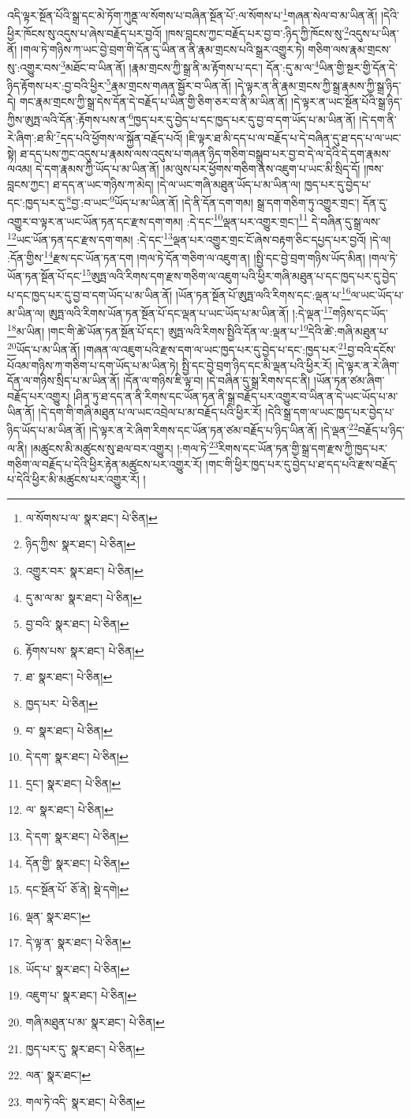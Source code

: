 འདི་ལྟར་སྔོན་པོའི་སྒྲ་དང་མེ་ཏོག་ཀུནྡ་ལ་སོགས་པ་བཞིན་སྔོན་པོ་:ལ་སོགས་པ་\footnote{ལ་སོགས་པ་ལ་  སྣར་ཐང་།  པེ་ཅིན། }གཞན་སེལ་བ་མ་ཡིན་ནོ། །དེའི་ཕྱིར་ཁོངས་སུ་འདུས་པ་ཞེས་བརྗོད་པར་བྱའོ། །ཁས་བླངས་ཀྱང་བརྗོད་པར་བྱ་བ་:ཉིད་ཀྱི་ཁོངས་སུ་\footnote{ཉིད་ཀྱིས་  སྣར་ཐང་།  པེ་ཅིན། }འདུས་པ་ཡིན་ནོ། །གལ་ཏེ་གཉིས་ཀ་ཡང་བྱེ་བྲག་གི་དོན་དུ་ཡིན་ན་ནི་རྣམ་གྲངས་པའི་སྒྲར་འགྱུར་ཏེ། གཅིག་ལས་རྣམ་གྲངས་སུ་:འགྱུར་བས་\footnote{འགྱུར་བར་  སྣར་ཐང་།  པེ་ཅིན། }མཐོང་བ་ཡིན་ནོ། །རྣམ་གྲངས་ཀྱི་སྒྲ་ནི་མ་རྟོགས་པ་དང་། དོན་:དུ་མ་ལ་\footnote{དུ་མ་ལ་མ་  སྣར་ཐང་།  པེ་ཅིན། }ཡིན་གྱི་སྔར་གྱི་དོན་དེ་ཉིད་རྟོགས་པར་:བྱ་བའི་ཕྱིར་\footnote{བྱ་བའི་  སྣར་ཐང་།  པེ་ཅིན། }རྣམ་གྲངས་གཞན་སྦྱོར་བ་ཡིན་ནོ། །དེ་ལྟར་ན་ནི་རྣམ་གྲངས་ཀྱི་སྒྲ་རྣམས་ཀྱི་སྒྲ་ཉིད་དེ། གང་རྣམ་གྲངས་ཀྱི་སྒྲ་དེས་དོན་དེ་བརྗོད་པ་ཡིན་གྱི་ཅིག་ཅར་བ་ནི་མ་ཡིན་ནོ། །དེ་ལྟར་ན་ཡང་སྔོན་པོའི་སྒྲ་ཉིད་ཀྱིས་ཨུཏྤ་ལའི་དོན་:རྟོགས་པས་ན་\footnote{རྟོགས་པས་  སྣར་ཐང་།  པེ་ཅིན། }ཁྱད་པར་དུ་བྱེད་པ་དང་ཁྱད་པར་དུ་བྱ་བ་དག་ཡོད་པ་མ་ཡིན་ནོ། །དེ་དག་ནི་རེ་ཞིག་:ཐ་མི་\footnote{ཐ་  སྣར་ཐང་།  པེ་ཅིན། }དད་པའི་ཕྱོགས་ལ་སྐྱོན་བརྗོད་པའོ། །ཇི་ལྟར་ཐ་མི་དད་པ་ལ་བརྗོད་པ་དེ་བཞིན་དུ་ཐ་དད་པ་ལ་ཡང་སྟེ། ཐ་དད་པས་ཀྱང་འདུས་པ་རྣམས་ལས་འདུས་པ་གཞན་ཉིད་གཅིག་བསྒྲུབ་པར་བྱ་བ་དེ་ལ་དེའི་དེ་དག་རྣམས་ལའམ། དེ་དག་རྣམས་ཀྱི་ཡོད་པ་མ་ཡིན་ནོ། །མ་ལུས་པར་ཕྱོགས་གཅིག་ནས་འཇུག་པ་ཡང་མི་སྲིད་དོ། །ཁས་བླངས་ཀྱང་། ཐ་དད་ན་ཡང་གཉིས་ཀ་མེད། །དེ་ལ་ཡང་གཞི་མཐུན་ཡོད་པ་མ་ཡིན་ལ། ཁྱད་པར་དུ་བྱེད་པ་དང་:ཁྱད་པར་དུ་\footnote{ཁྱད་པར་  པེ་ཅིན། }བྱ་:བ་ཡང་\footnote{བ་  སྣར་ཐང་།  པེ་ཅིན། }ཡོད་པ་མ་ཡིན་ནོ། །དེ་ནི་དོན་དག་གམ། སྒྲ་དག་གཅིག་ཏུ་འགྱུར་གྲང་། དོན་དུ་འགྱུར་བ་ལྟར་ན་ཡང་ཡོན་ཏན་དང་རྫས་དག་གམ། :དེ་དང་\footnote{དེ་དག་  སྣར་ཐང་།  པེ་ཅིན། }ལྡན་པར་འགྱུར་གྲང་།\footnote{དྲང་།  སྣར་ཐང་།  པེ་ཅིན། } དེ་བཞིན་དུ་སྒྲ་ལས་\footnote{ལ་  སྣར་ཐང་།  པེ་ཅིན། }ཡང་ཡོན་ཏན་དང་རྫས་དག་གམ། :དེ་དང་\footnote{དེ་དག་  སྣར་ཐང་།  པེ་ཅིན། }ལྡན་པར་འགྱུར་གྲང་ངོ་ཞེས་བརྟག་ཅིང་དཔྱད་པར་བྱའོ། །དེ་ལ། :དོན་གྱིས་\footnote{དོན་གྱི་  སྣར་ཐང་།  པེ་ཅིན། }རྫས་དང་ཡོན་ཏན་དག །གལ་ཏེ་དོན་གཅིག་ལ་འཇུག་ན། །སྤྱི་དང་བྱེ་བྲག་གཉིས་ཡོད་མིན། །གལ་ཏེ་ཡོན་ཏན་སྔོན་པོ་དང་\footnote{དང་སྔོན་པོ་  ཅོ་ནེ།  སྡེ་དགེ། }ཨུཏྤ་ལའི་རིགས་དག་རྫས་གཅིག་ལ་འཇུག་པའི་ཕྱིར་གཞི་མཐུན་པ་དང་ཁྱད་པར་དུ་བྱེད་པ་དང་ཁྱད་པར་དུ་བྱ་བ་དག་ཡོད་པ་མ་ཡིན་ནོ། །ཡོན་ཏན་སྔོན་པོ་ཨུཏྤ་ལའི་རིགས་དང་:ལྡན་པ་\footnote{ལྡན་  སྣར་ཐང་། }ལ་ཡང་ཡོད་པ་མ་ཡིན་ལ། ཨུཏྤ་ལའི་རིགས་ཡོན་ཏན་སྔོན་པོ་དང་ལྡན་པ་ཡང་ཡོད་པ་མ་ཡིན་ནོ། །:དེ་ལྡན་\footnote{དེ་ལྟ་ན་  སྣར་ཐང་།  པེ་ཅིན། }གཉིས་དང་ཡོད་\footnote{ཡོད་པ་  སྣར་ཐང་།  པེ་ཅིན། }མ་ཡིན། །གང་གི་ཚེ་ཡོན་ཏན་སྔོན་པོ་དང་། ཨུཏྤ་ལའི་རིགས་སྤྱིའི་དོན་ལ་:ལྡན་པ་\footnote{འཇུག་པ་  སྣར་ཐང་།  པེ་ཅིན། }དེའི་ཚེ་:གཞི་མཐུན་པ་\footnote{གཞི་མཐུན་པ་མ་  སྣར་ཐང་།  པེ་ཅིན། }ཡོད་པ་མ་ཡིན་ནོ། །གཞན་ལ་འཇུག་པའི་རྫས་དག་ལ་ཡང་ཁྱད་པར་དུ་བྱེད་པ་དང་:ཁྱད་པར་\footnote{ཁྱད་པར་དུ་  སྣར་ཐང་།  པེ་ཅིན། }བྱ་བའི་དངོས་པོའམ་གཉིས་ཀ་གཅིག་པ་དག་ཡོད་པ་མ་ཡིན་ཏེ། སྤྱི་དང་བྱེ་བྲག་ཉིད་དང་མི་ལྡན་པའི་ཕྱིར་རོ། །དེ་ལྟར་ན་རེ་ཞིག་དོན་ལ་གཉིས་སྲིད་པ་མ་ཡིན་ནོ། །དོན་ལ་གཉིས་ཇི་ལྟ་བ། །དེ་བཞིན་དུ་སྒྲ་རིགས་དང་ནི། །ཡོན་ཏན་ཙམ་ཞིག་བརྗོད་པར་འགྱུར། །ཤིན་ཏུ་ཐ་དད་ན་ནི་རིགས་དང་ཡོན་ཏན་ནི་སྒྲ་བརྗོད་པར་འགྱུར་བ་ཡིན་ན་དེ་ཡང་ཡོད་པ་མ་ཡིན་ནོ། །དེ་དག་གི་གཞི་མཐུན་པ་ལ་ཡང་འབྲེལ་པ་མ་བརྗོད་པའི་ཕྱིར་རོ། །དེའི་སྒྲ་དག་ལ་ཡང་ཁྱད་པར་བྱེད་པ་ཉིད་ཡོད་པ་མ་ཡིན་ནོ། །དེ་ལྟར་ན་རེ་ཞིག་རིགས་དང་ཡོན་ཏན་ཙམ་བརྗོད་པ་ཉིད་ཡིན་ནོ། །དེ་ལྡན་\footnote{ལན་  སྣར་ཐང་། }བརྗོད་པ་ཉིད་ལ་ནི། །མཚུངས་མི་མཚུངས་སུ་ཐལ་བར་འགྱུར། །:གལ་ཏེ་\footnote{གལ་ཏེ་འདི་  སྣར་ཐང་།  པེ་ཅིན། }རིགས་དང་ཡོན་ཏན་གྱི་སྒྲ་དག་རྫས་ཀྱི་ཁྱད་པར་གཅིག་ལ་བརྗོད་པ་དེའི་ཕྱིར་རྟེན་མཚུངས་པར་འགྱུར་རོ། །གང་གི་ཕྱིར་ཁྱད་པར་དུ་བྱེད་པ་ཐ་དད་པའི་རྫས་བརྗོད་པ་དེའི་ཕྱིར་མི་མཚུངས་པར་འགྱུར་རོ། །
